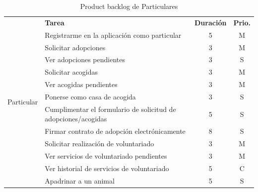 \begin{table}[H]
	\centering
	\begin{tabular}{|c |p{8cm}|c |c|} \hline 
		\multirow[c]{14}{*}{Particular}&  \textbf{Tarea}&  \textbf{Duración}& \textbf{Prio.}\\  \cline{2-4}
		&  Registrarme en la aplicación como particular&  5& M\\ \cline{2-4} 
		
		
		&  Solicitar adopciones&  3& M\\ \cline{2-4}
		&  Ver adopciones pendientes&  3& S\\ \cline{2-4}
		
		&  Solicitar acogidas&  3& M\\ \cline{2-4} 
		&  Ver acogidas pendientes&  3& M\\ \cline{2-4}
		
		&  Ponerse como casa de acogida&  3& S\\ \cline{2-4}
		
		&  Cumplimentar el formulario de solicitud de adopciones/acogidas &  5& S\\ \cline{2-4}
		&  Firmar contrato de adopción electrónicamente&  8& S\\ \cline{2-4}
		
		
		&  Solicitar realización de voluntariado&  3& M\\ \cline{2-4} 
		&  Ver servicios de voluntariado pendientes&  3& M\\ \cline{2-4}
		&  Ver historial de servicios de voluntariado&  5& C\\ \cline{2-4}
		
		
		& Apadrinar a un animal&  5& S\\ \hline
		
		
		
	\end{tabular}
	\caption{Product backlog de Particulares}
	\label{tab:pb_particulares}
\end{table}

